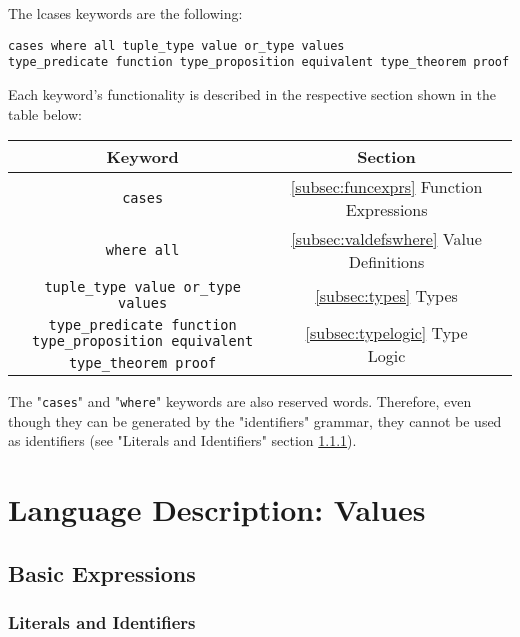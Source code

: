 \documentclass{article}
\begin{document}
The lcases keywords are the following:
\begin{verbatim}
cases where all tuple_type value or_type values
type_predicate function type_proposition equivalent type_theorem proof
\end{verbatim}
Each keyword's functionality is described in the respective section shown in the 
table below:

\begin{center}
\begin{tabular}{ |c|c|c| } 
\hline
Keyword & Section \\ 
\hline
\hline
\texttt{cases} & \ref{subsec:funcexprs} Function Expressions \\
\hline
\texttt{where all} & \ref{subsec:valdefswhere} Value Definitions \\
\hline
\texttt{tuple_type value or_type values} & \ref{subsec:types} Types \\
\hline
\texttt{type_predicate function type_proposition equivalent} &
  \multirow{2}{*}{\ref{subsec:typelogic} Type Logic} \\
\texttt{type_theorem proof} & \\
\hline
\end{tabular}
\end{center}
The "\texttt{cases}" and "\texttt{where}" keywords are also
reserved words. Therefore, even though they can be generated by the
"identifiers" grammar, they cannot be used as identifiers (see "Literals and
Identifiers" section \ref{subsubsec:litsandidents}).

\section{Language Description: Values}

\subsection{Basic Expressions}

\subsubsection{Literals and Identifiers}
\label{subsubsec:litsandidents}
\end{document}
